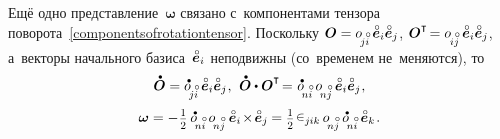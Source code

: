 \begin{otherlanguage}{russian}
Ещё одно представление~$\bm{\omega}$ связано с~компонентами тензора поворота~\eqref{componentsofrotationtensor}. Поскольку ${\rotationtensor = \cosinematrix{\!j\mathcircabove{i}} \hspace{.4ex} \mathcircabove{\bm{e}}_i \mathcircabove{\bm{e}}_j}$, ${\rotationtensor^{\T} \hspace{-0.32ex} = \cosinematrix{\hspace{-0.2ex}i\mathcircabove{j}} \hspace{.4ex} \mathcircabove{\bm{e}}_i \mathcircabove{\bm{e}}_j}$, а~векторы начального базиса~${\mathcircabove{\bm{e}}_i}$ неподвижны (со~временем не~меняются), то
\nopagebreak\vspace{.25em}\[ \mathdotabove{\rotationtensor} = \cosinematrixdotted{\!j\mathcircabove{i}} \hspace{.4ex} \mathcircabove{\bm{e}}_i \mathcircabove{\bm{e}}_j
\hspace{.1ex} , \:\,
\mathdotabove{\rotationtensor} \dotp \rotationtensor^{\T} \hspace{-0.32ex} = \hspace{.1ex} \cosinematrixdotted{\hspace{-0.4ex}n\mathcircabove{i}} \hspace{.4ex} \cosinematrix{\hspace{-0.4ex}n\mathcircabove{j}} \hspace{.4ex} \mathcircabove{\bm{e}}_i \mathcircabove{\bm{e}}_j
\hspace{.1ex}, \]
\nopagebreak\vspace{-0.64em}\begin{equation}
\bm{\omega} = - \hspace{.1ex} \smalldisplaystyleonehalf \hspace{.4ex} \cosinematrixdotted{\hspace{-0.4ex}n\mathcircabove{i}} \hspace{.4ex} \cosinematrix{\hspace{-0.4ex}n\mathcircabove{j}} \hspace{.5ex} \mathcircabove{\bm{e}}_i \hspace{-0.3ex}\times\hspace{-0.3ex} \mathcircabove{\bm{e}}_j \hspace{-0.1ex} =
\smalldisplaystyleonehalf \hspace{.2ex} \permutationsparitysymbols{j\hspace{-0.06ex}ik} \hspace{.32ex} \cosinematrix{\hspace{-0.4ex}n\mathcircabove{j}} \hspace{.4ex} \cosinematrixdotted{\hspace{-0.4ex}n\mathcircabove{i}} \hspace{.4ex} \mathcircabove{\bm{e}}_k
\hspace{.2ex} .
\end{equation}


\end{otherlanguage}

